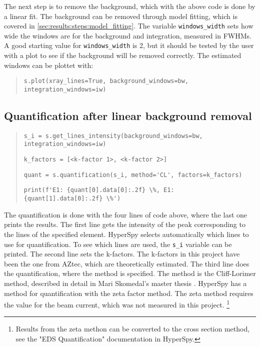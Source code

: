 The next step is to remove the background, which with the above code is done by a linear fit.
The background can be removed through model fitting, which is covered in \cref{sec:results:steps:model_fitting}.
The variable \verb|windows_width| sets how wide the windows are for the background and integration, measured in FWHMs.
A good starting value for \verb|windows_width| is 2, but it should be tested by the user with a plot to see if the background will be removed correctly.
The estimated windows can be plottet with:

\begin{quote}
    \verb|s.plot(xray_lines=True, background_windows=bw, integration_windows=iw)|
\end{quote}


\subsection{Quantification after linear background removal}
\label{sec:results:steps:quantification:linear}

\begin{quote}
    \verb|s_i = s.get_lines_intensity(background_windows=bw, integration_windows=iw)|

    \verb|k_factors = [<k-factor 1>, <k-factor 2>]  |

    \verb|quant = s.quantification(s_i, method='CL', factors=k_factors)|

    \verb|print(f'E1: {quant[0].data[0]:.2f} \%, E1: {quant[1].data[0]:.2f} \%')|
\end{quote}

The quantification is done with the four lines of code above, where the last one prints the results.
The first line gets the intensity of the peak corresponding to the lines of the specified element.
HyperSpy selects automatically which lines to use for quantification.
To see which lines are used, the \verb|s_i| variable can be printed.
The second line sets the k-factors.
The k-factors in this project have been the one from AZtec, which are theoretically estimated.
The third line does the quantification, where the method is specified.
The method is the Cliff-Lorimer method, described in detail in Mari Skomedal's master thesis \cite[Sec. 2.2.3]{skomedal_improving_2022}.
HyperSpy has a method for quantification with the zeta factor method.
The zeta method requires the value for the beam current, which was not measured in this project. \footnote{Results from the zeta methon can be converted to the cross section method, see the "EDS Quantification" documentation in HyperSpy.}



